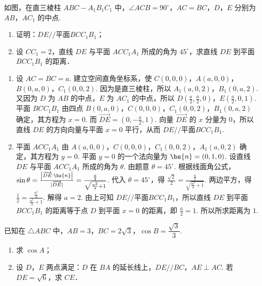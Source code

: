 \begin{problem}
如图，在直三棱柱 \(ABC-A_1B_1C_1\) 中，\(\angle ACB=90^\circ\)，\(AC=BC\)，\(D\)，\(E\) 分别为 \(AB\)，\(AC_1\) 的中点.

\begin{enumerate}
\item 证明：\(DE // \text{平面} BCC_1B_1\)；
\item 设 \(CC_1=2\)，直线 \(DE\) 与平面 \(ACC_1A_1\) 所成的角为 \(45^\circ\)，求直线 \(DE\) 到平面 \(BCC_1B_1\) 的距离．
\end{enumerate}

\end{problem}

\begin{solution}
\begin{enumerate}
\item 设 \(AC=BC=a\). 建立空间直角坐标系，使 \(C(0,0,0)\)，\(A(a,0,0)\)，\(B(0,a,0)\)，\(C_1(0,0,2)\). 因为是直三棱柱，所以 \(A_1(a,0,2)\)，\(B_1(0,a,2)\). 又因为 \(D\) 为 \(AB\) 的中点，\(E\) 为 \(AC_1\) 的中点，所以 \(D\left( \frac{a}{2},\frac{a}{2},0 \right)\)，\(E\left( \frac{a}{2},0,1 \right)\).
平面 \(BCC_1B_1\) 由四点 \(B(0,a,0)\)，\(C(0,0,0)\)，\(C_1(0,0,2)\)，\(B_1(0,a,2)\) 确定，其方程为 \(x=0\). 而 \(\overrightarrow{DE}=\left( 0,-\frac{a}{2},1 \right)\). 向量 \(\overrightarrow{DE}\) 的 \(x\) 分量为 \(0\)，所以直线 \(DE\) 的方向向量与平面 \(x=0\) 平行，从而 \(DE // \text{平面} BCC_1B_1\).

\item 平面 \(ACC_1A_1\) 由 \(A(a,0,0)\)，\(C(0,0,0)\)，\(C_1(0,0,2)\)，\(A_1(a,0,2)\) 确定，其方程为 \(y=0\). 平面 \(y=0\) 的一个法向量为 \(\bs{n}=(0,1,0)\).
设直线 \(DE\) 与平面 \(ACC_1A_1\) 所成的角为 \(\theta\). 由题意 \(\theta=45^\circ\). 根据线面角公式，\(\sin\theta=\frac{\left| \overrightarrow{DE}\cdot \bs{n} \right|}{\lvert \overrightarrow{DE}\rvert}=\frac{\frac{a}{2}}{\sqrt{\frac{a^2}{4}+1}}\).
代入 \(\theta=45^\circ\)，得 \(\frac{\sqrt{2}}{2}=\frac{\frac{a}{2}}{\sqrt{\frac{a^2}{4}+1}}\). 两边平方，得 \(\frac{1}{2}=\frac{\frac{a^2}{4}}{\frac{a^2}{4}+1}\). 解得 \(a=2\).
由上可知 \(DE // \text{平面} BCC_1B_1\)，所以直线 \(DE\) 到平面 \(BCC_1B_1\) 的距离等于点 \(D\) 到平面 \(x=0\) 的距离，即 \(\frac{a}{2}=1\). 所以所求距离为 \(1\).
\end{enumerate}
\end{solution}

\begin{problem}
已知在 \(\triangle ABC\) 中，\(AB=3\)，\(BC=2\sqrt{3}\)，\(\cos B=\dfrac{\sqrt{3}}{3}\).

\begin{enumerate}
\item 求 \(\cos A\)；
\item 设 \(D\)，\(E\) 两点满足：\(D\) 在 \(BA\) 的延长线上，\(DE // BC\)，\(AE\perp AC\). 若 \(DE=\sqrt{6}\)，求 \(CE\)．
\end{enumerate}
\end{problem}

